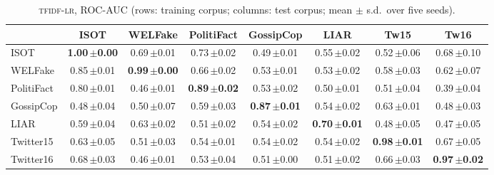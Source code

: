 \begin{table}[h]
\centering
\caption{\textsc{tfidf-lr}, ROC-AUC (rows: training corpus; columns: test corpus; mean $\pm$ s.d.\ over five seeds).}
\scriptsize
\begin{tabular}{@{}lccccccc@{}}
\toprule
 & ISOT & WELFake & PolitiFact & GossipCop & LIAR & Tw15 & Tw16 \\
\midrule
ISOT & \textbf{1.00\,{\tiny$\pm$0.00}} & 0.69\,{\tiny$\pm$0.01} & 0.73\,{\tiny$\pm$0.02} & 0.49\,{\tiny$\pm$0.01} & 0.55\,{\tiny$\pm$0.02} & 0.52\,{\tiny$\pm$0.06} & 0.68\,{\tiny$\pm$0.10} \\
WELFake & 0.85\,{\tiny$\pm$0.01} & \textbf{0.99\,{\tiny$\pm$0.00}} & 0.66\,{\tiny$\pm$0.02} & 0.53\,{\tiny$\pm$0.01} & 0.53\,{\tiny$\pm$0.02} & 0.58\,{\tiny$\pm$0.03} & 0.62\,{\tiny$\pm$0.07} \\
PolitiFact & 0.80\,{\tiny$\pm$0.01} & 0.46\,{\tiny$\pm$0.01} & \textbf{0.89\,{\tiny$\pm$0.02}} & 0.53\,{\tiny$\pm$0.02} & 0.50\,{\tiny$\pm$0.01} & 0.51\,{\tiny$\pm$0.04} & 0.39\,{\tiny$\pm$0.04} \\
GossipCop & 0.48\,{\tiny$\pm$0.04} & 0.50\,{\tiny$\pm$0.07} & 0.59\,{\tiny$\pm$0.03} & \textbf{0.87\,{\tiny$\pm$0.01}} & 0.54\,{\tiny$\pm$0.02} & 0.63\,{\tiny$\pm$0.01} & 0.48\,{\tiny$\pm$0.03} \\
LIAR & 0.59\,{\tiny$\pm$0.04} & 0.63\,{\tiny$\pm$0.02} & 0.51\,{\tiny$\pm$0.02} & 0.54\,{\tiny$\pm$0.02} & \textbf{0.70\,{\tiny$\pm$0.01}} & 0.48\,{\tiny$\pm$0.05} & 0.47\,{\tiny$\pm$0.05} \\
Twitter15 & 0.63\,{\tiny$\pm$0.05} & 0.51\,{\tiny$\pm$0.03} & 0.54\,{\tiny$\pm$0.01} & 0.54\,{\tiny$\pm$0.02} & 0.54\,{\tiny$\pm$0.02} & \textbf{0.98\,{\tiny$\pm$0.01}} & 0.67\,{\tiny$\pm$0.05} \\
Twitter16 & 0.68\,{\tiny$\pm$0.03} & 0.46\,{\tiny$\pm$0.01} & 0.53\,{\tiny$\pm$0.04} & 0.51\,{\tiny$\pm$0.00} & 0.51\,{\tiny$\pm$0.02} & 0.66\,{\tiny$\pm$0.03} & \textbf{0.97\,{\tiny$\pm$0.02}} \\
\bottomrule
\end{tabular}
\end{table}

